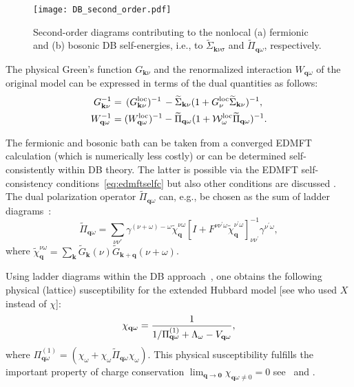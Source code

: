 \documentclass[rmp,aps,reprint,amsmath,amssymb,superscriptaddress,showpacs,nofootinbib]{revtex4-1}
\newcommand{\kv}{\ensuremath{\mathbf{k}}}
\newcommand{\qv}{\ensuremath{\mathbf{q}}}
\newcommand{\vc}[1]{\ensuremath{\mathbf{#1}}}
\begin{document}
\begin{figure}[t]
  \texttt{[image: DB\_second\_order.pdf]}
    \caption{Second-order diagrams contributing to the nonlocal (a) fermionic and  (b) bosonic DB self-energies, i.e., to $\widetilde{\Sigma}_{\kv\nu\sigma}$ and $\widetilde{\Pi}_{\qv\omega}$, respectively.}
  \label{fig:dbdiag}
\end{figure}

The physical Green's function $G_{\kv\nu}$ and the renormalized interaction $W_{\qv\omega}$ of the original model can be expressed in terms of the dual quantities as follows:
\begin{align}
\label{eq:DBsig}
  G_{\kv\nu}^{-1} &= \,(G^{\rm loc}_{\kv\nu})^{-1}\, - {\widetilde\Sigma_{\kv\nu}}({1+G^{\text{loc}}_{\nu}\widetilde\Sigma_{\kv\nu}})^{-1},\\
\label{eq:dual_X-Pi}  
  W_{\qv\omega}^{-1} &= (W^{\rm loc}_{\qv\omega})^{-1} - {\widetilde\Pi_{\qv\omega}}({1+{\cal W}^{\text{loc}}_{\omega}\widetilde\Pi_{\qv\omega}})^{-1}.
\end{align}

The fermionic and bosonic bath can be taken from a converged EDMFT calculation  (which is numerically less costly) or 
can be determined  self-consistently within DB theory. The latter is possible via the EDMFT self-consistency conditions~\eqref{eq:edmftselfc} but also other conditions are discussed \cite{Stepanov2016}. The  dual polarization operator $\widetilde{\Pi }_{\mathbf{q}\omega }$ can, e.g., be chosen as the sum of ladder diagrams~\cite{vanLoon2014,Hafermann2014a,vanLoon2014a,Stepanov2016}:
\begin{equation}
\label{eq:dualpolladder}
  \widetilde{\Pi }_{\mathbf{q}\omega }=\sum_{\nu\nu'}\gamma^{(\nu +\omega) -\omega }\widetilde{\chi }_{\mathbf{q}}^{\nu \omega }\left[I+F^{\nu \nu ^{\prime}\omega }\widetilde{\chi }_{\mathbf{q}}^{\nu^{\prime}\omega }\right] _{\nu \nu ^{\prime }}^{-1}\gamma^{\nu ^{\prime}\omega },
\end{equation}%
where $\widetilde{\chi }_{\mathbf{q}}^{\nu \omega } =\sum\limits_{\mathbf{k}}\widetilde{G}_{\mathbf{k}}(\nu )\widetilde{G}_{\mathbf{k+q}}(\nu +\omega )$.

Using ladder diagrams within the DB approach~\cite{vanLoon2014,Hafermann2014a,vanLoon2014a}, one obtains the following  physical (lattice) susceptibility for the extended Hubbard model [see  who used $X$ instead of $\chi$]:
\begin{equation}
\label{eq:Suscept_phys}
  \chi_{\mathbf{q}\omega }=\frac{1}{1/\Pi _{\mathbf{q}\omega }^{(1)}+\Lambda_\omega-V_{{\bf q}\omega}},
\end{equation}
where $\Pi _{\mathbf{q}\omega }^{(1)} =(\chi _{\omega }+\chi_{\omega }\widetilde{\Pi }_{\mathbf{q}\omega }\chi_{\omega })$. This physical susceptibility fulfills the important property of charge conservation $\lim_{\vc{q}\to \vc{0}}\chi_{\mathbf{q}\omega\neq 0}=0$ see~ and .	
\end{document}
